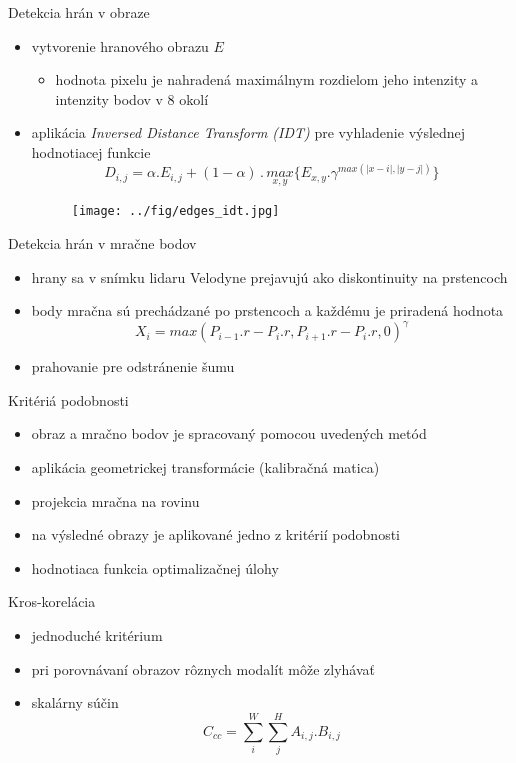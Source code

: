 \documentclass[pdf]{beamer}
\begin{document}
	\begin{frame}{Detekcia hrán v obraze}
		\begin{itemize}
			\item vytvorenie hranového obrazu $E$
			\begin{itemize}
				\item hodnota pixelu je nahradená maximálnym rozdielom jeho intenzity a intenzity bodov v $8$ okolí
			\end{itemize}
			\item aplikácia \emph{Inversed Distance Transform (IDT)} pre vyhladenie výslednej hodnotiacej funkcie
			$$
				D_{i,j} = \alpha . E_{i,j} + (1-\alpha)\,.\,\underset{x,y}{max}\{ E_{x,y} . \gamma^{max(\vert x-i \vert, \vert y-j \vert)}\}
			$$
			\begin{figure}[h]
				\center
				\texttt{[image: ../fig/edges\_idt.jpg]}
			\end{figure}
		\end{itemize}
	\end{frame}

	\begin{frame}{Detekcia hrán v mračne bodov}
		\begin{itemize}
			\item hrany sa v snímku lidaru Velodyne prejavujú ako diskontinuity na prstencoch
			\item body mračna sú prechádzané po prstencoch a každému je priradená hodnota
				$$ X_i = max(P_{i-1}.r - P_i.r, P_{i+1}.r - P_i.r, 0)^\gamma $$
			\item prahovanie pre odstránenie šumu
		\end{itemize}
	\end{frame}
	
	\begin{frame}{Kritériá podobnosti}
		\begin{itemize}
			\item obraz a mračno bodov je spracovaný pomocou uvedených metód
			\item aplikácia geometrickej transformácie (kalibračná matica)			
			\item projekcia mračna na rovinu
			\item na výsledné obrazy je aplikované jedno z kritérií podobnosti
			\item hodnotiaca funkcia optimalizačnej úlohy
		\end{itemize}
	\end{frame}

	\begin{frame}{Kros-korelácia}
		\begin{itemize}
			\item jednoduché kritérium 
			\item pri porovnávaní obrazov rôznych modalít môže zlyhávať 
			\item skalárny súčin
			$$ C_{cc} = \sum\limits_i^W \sum\limits_j^H A_{i,j} . B_{i,j} $$
		\end{itemize}
	\end{frame}
	
\end{document}

